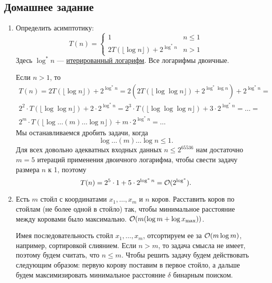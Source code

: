 \subsection{Домашнее задание}
\begin{enumerate}
  \item 
	Определить асимптотику:
	$$T(n) =
	  \begin{cases}
	    1 & n \le 1 \\
	    2 T(\lfloor \log n \rfloor) + 2^{\log^* n} & n > 1
	  \end{cases}
	$$
	Здесь $\log^* n$ --- \href{https://en.wikipedia.org/wiki/Iterated_logarithm}{итерированный логарифм}.
	Все логарифмы двоичные.
	\begin{solution}
		Если $n > 1$, то 
		\begin{eqnarray}
			T(n) = 2 T(\lfloor \log n \rfloor) + 2^{\log^* n} = 2 (2 T(\lfloor \log \log n \rfloor) + 2^{\log^* \log n}) + 2^{\log^* n} = \\
			2^2 \cdot T(\lfloor \log \log n \rfloor) + 2\cdot2^{\log^* n} = 2^3 \cdot T(\lfloor \log \log \log n \rfloor) + 3 \cdot 2^{\log^* n} = \ldots = \\
			2^m \cdot T(\lfloor \log \ldots (m) \ldots \log n \rfloor) + m \cdot 2^{\log^* n} = \ldots
		\end{eqnarray}
		Мы останавливаемся дробить задачи, когда
		\begin{equation}
			\log \ldots (m) \ldots \log n \leq 1.
		\end{equation}
		Для всех довольно адекватных входных данных $n \leq 2^{65536}$ нам достаточно $m=5$ итераций применения двоичного логарифма, чтобы свести задачу размера $n$ к 1, поэтому
		\begin{equation}
			T(n) = 2^5 \cdot 1 + 5 \cdot 2^{\log^* n} = \mathcal{O}(2^{\log^* }).
		\end{equation}
	\end{solution}

  \item 
	Есть $m$ стойл с координатами $x_1, \ldots, x_m$ и $n$ коров. Расставить коров по стойлам
	(не более одной в стойло) так, чтобы минимальное расстояние между коровами было максимально.
	$\mathcal{O}(m (\log{m} + \log{x_{\max}}))$.
	\begin{solution}
		Имея последовательность стойл $x_1, \ldots, x_m$, отсортируем ее за $\mathcal{O}(m \log m)$, например, сортировкой слиянием. Если $n > m$, то задача смысла не имеет, поэтому будем считать, что $n \leq m$. Чтобы решить задачу будем действовать следующим образом: первую корову поставим в первое стойло, а дальше будем максимизировать минимальное расстояние $\delta$ бинарным поиском.
		

\end{solution}
\end{enumerate}
